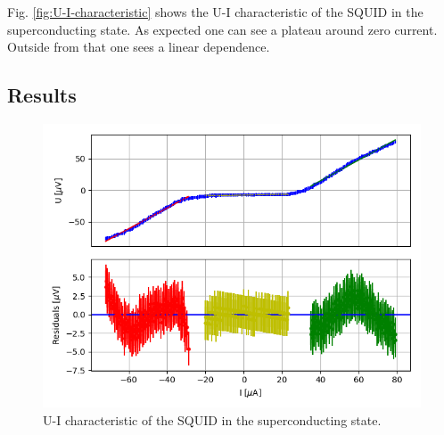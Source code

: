 \documentclass[12pt,a4paper]{article}
\begin{document}
Fig. \ref{fig:U-I-characteristic} shows the U-I characteristic of the SQUID in the superconducting state. As expected one can see a plateau around zero current. Outside from that one sees a linear dependence.

\subsection{Results}

\begin{figure} [H]
\centering
\includegraphics[scale=0.8]{Bilder/U_I_characteristic/fit_43.PNG}
\caption{U-I characteristic of the SQUID in the superconducting state.}
\label{fig:U-I-characteristic_fit}
\end{figure}
\end{document}
